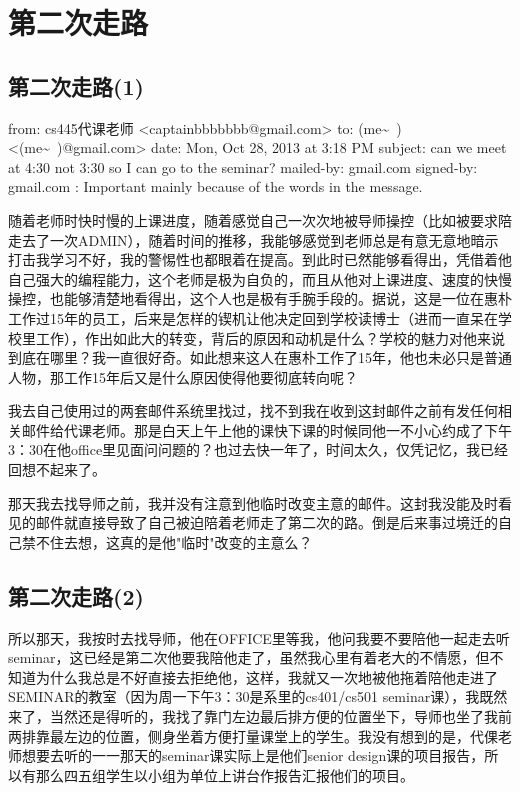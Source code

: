 \documentclass[12pt]{book}
\begin{document}
\chapter{第二次走路}
\label{sec-25}
\section{第二次走路(1)}
\label{sec-25-1}

from:         cs445代课老师 <captainbbbbbbb@gmail.com>
to:         (me\textasciitilde{}~) <(me\textasciitilde{}~)@gmail.com>
date:         Mon, Oct 28, 2013 at 3:18 PM
subject:         can we meet at 4:30 not 3:30 so I can go to the seminar?
mailed-by:         gmail.com
signed-by:         gmail.com
:         Important mainly because of the words in the message.

随着老师时快时慢的上课进度，随着感觉自己一次次地被导师操控（比如被要求陪走去了一次ADMIN），随着时间的推移，我能够感觉到老师总是有意无意地暗示打击我学习不好，我的警惕性也都眼着在提高。到此时已然能够看得出，凭借着他自己强大的编程能力，这个老师是极为自负的，而且从他对上课进度、速度的快慢操控，也能够清楚地看得出，这个人也是极有手腕手段的。据说，这是一位在惠朴工作过15年的员工，后来是怎样的锲机让他决定回到学校读博士（进而一直呆在学校里工作），作出如此大的转变，背后的原因和动机是什么？学校的魅力对他来说到底在哪里？我一直很好奇。如此想来这人在惠朴工作了15年，他也未必只是普通人物，那工作15年后又是什么原因使得他要彻底转向呢？

我去自己使用过的两套邮件系统里找过，找不到我在收到这封邮件之前有发任何相关邮件给代课老师。那是白天上午上他的课快下课的时候同他一不小心约成了下午3：30在他office里见面问问题的？也过去快一年了，时间太久，仅凭记忆，我已经回想不起来了。

那天我去找导师之前，我并没有注意到他临时改变主意的邮件。这封我没能及时看见的邮件就直接导致了自己被迫陪着老师走了第二次的路。倒是后来事过境迁的自己禁不住去想，这真的是他"临时"改变的主意么？

\section{第二次走路(2)}
\label{sec-25-2}

所以那天，我按时去找导师，他在OFFICE里等我，他问我要不要陪他一起走去听seminar，这已经是第二次他要我陪他走了，虽然我心里有着老大的不情愿，但不知道为什么我总是不好直接去拒绝他，这样，我就又一次地被他拖着陪他走进了SEMINAR的教室（因为周一下午3：30是系里的cs401/cs501 seminar课），我既然来了，当然还是得听的，我找了靠门左边最后排方便的位置坐下，导师也坐了我前两排靠最左边的位置，侧身坐着方便打量课堂上的学生。我没有想到的是，代倮老师想要去听的一一那天的seminar课实际上是他们senior design课的项目报告，所以有那么四五组学生以小组为单位上讲台作报告汇报他们的项目。
\end{document}
